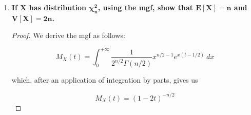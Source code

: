 \documentclass[10pt, oneside]{article}
\begin{document}
\begin{enumerate}[label=10.\arabic*]
	\begin{enumerate}
	\item  \begin{tcolorbox}[
	  colback=Cerulean!5!white,
	  colframe=Cerulean!75!black]
	\textbf{Find the mgf of $\bm{R}$.}
	\end{tcolorbox}
	
	For any individual $R_i$, we have
	
	\[ M_{R_i} (t) = \int^1_0 e^{tx} \ dx = \frac{1}{t} (e^t - 1) \]
	
	Therefore,
	
	\[ M_R(t) = \prod^n_{i=1} M_{R_i}(t) = \boxed{ \frac{1}{t^n} (e^t - 1)^n } \]
	
	\item  \begin{tcolorbox}[
	  colback=Cerulean!5!white,
	  colframe=Cerulean!75!black]
	\textbf{Using the mgf, obtain $\bm{E[R]}$ and $\bm{V[R]}$. Check your answers by direct computation.}
	\end{tcolorbox}
	\end{enumerate}
	
	By assumption of independence, we can directly compute $\boxed{E[X] = n/2}$ and $\boxed{V[X] = n/12}$. Differentiating the mgf gives us
	
	\[ M'_R(t) = n (e^t - 1)^{n-1} \bigg( \frac{e^t}{t^n} - \frac{(e^t - 1)}{t^{n+1}} \bigg) \]
	
	For which the evaluation of its limit at $t \rightarrow 0$ eludes me. Hopefully you the reader can figure it out and teach me how to do so, but this should be a lesson in how the moment-generating function is not necessarily the best way to derive a distribution's expectation or variance!

\item  \begin{tcolorbox}[
  colback=Cerulean!5!white,
  colframe=Cerulean!75!black]
\textbf{If $\bm{X}$ has distribution $\bm{\chi^2_n}$, using the mgf, show that $\bm{E[X] = n}$ and $\bm{V[X] = 2n}$.}
\end{tcolorbox}

\begin{proof}
We derive the mgf as follows:

\[ M_X(t) = \int^{+\infty}_0 \frac{1}{2^{n/2} \Gamma (n/2)} x^{n/2-1} e^{x(t-1/2)} \ dx \]

which, after an application of integration by parts, gives us

\[ M_X(t) = (1-2t)^{-n/2} \]


\end{proof}
\end{enumerate}
\end{document}
